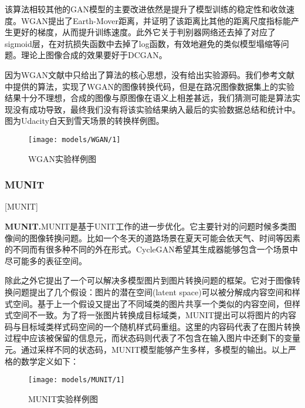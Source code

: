  该算法相较其他的GAN模型的主要改进依然是提升了模型训练的稳定性和收敛速度。WGAN提出了Earth-Mover距离，并证明了该距离比其他的距离尺度指标能产生更好的梯度，从而提升训练速度。此外它关于判别器网络还去掉了对应了sigmoid层，在对抗损失函数中去掉了log函数，有效地避免的类似模型塌缩等问题。理论上图像合成的效果要好于DCGAN。

因为WGAN文献中只给出了算法的核心思想，没有给出实验源码。我们参考文献中提供的算法，实现了WGAN的图像转换代码，但是在路况图像数据集上的实验结果十分不理想，合成的图像与原图像在语义上相差甚远，我们猜测可能是算法实现没有成功导致，最终我们没有将该实验结果纳入最后的实验数据总结和统计中。图为Udacity白天到雪天场景的转换样例图。

\begin{figure}[ht]
    \centering
    \texttt{[image: models/WGAN/1]}
    \caption{WGAN实验样例图}
    \label{fig:wgan}
\end{figure}

\subsubsection{MUNIT}[MUNIT]

\textbf{MUNIT.}\cite{MUNIT}\quad MUNIT是基于UNIT\cite{UNIT}工作的进一步优化。它主要针对的问题时候多类图像间的图像转换问题。比如一个冬天的道路场景在夏天可能会依天气、时间等因素的不同而有很多种不同的外在形式。CycleGAN希望其生成器能够包含一个场景中尽可能多的表征空间。

除此之外它提出了一个可以解决多模型图片到图片转换问题的框架。它对于图像转换问题提出了几个假设：图片的潜在空间(latent space)可以被分解成内容空间和样式空间。基于上一个假设又提出了不同域类的图片共享一个类似的内容空间，但样式空间不一致。为了将一张图片转换成目标域类，MUNIT提出可以将图片的内容码与目标域类样式码空间的一个随机样式码重组。这里的内容码代表了在图片转换过程中应该被保留的信息元，而状态码则代表了不包含在输入图片中还剩下的变量元。通过采样不同的状态码，MUNIT模型能够产生多样，多模型的输出。以上严格的数学定义如下：

\begin{figure}[t]
    \centering
    \texttt{[image: models/MUNIT/1]}
    \caption{MUNIT实验样例图}
    \label{fig:munit}
\end{figure}

